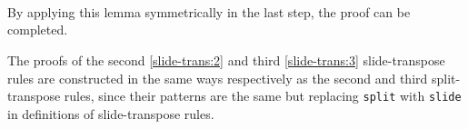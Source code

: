 \documentclass{l4proj}
\begin{document}
\begin{code}
\AgdaSymbol{(}\AgdaSpace{}%
\AgdaSymbol{)}\AgdaSpace{}%
\AgdaSymbol{(}\AgdaSpace{}%
\AgdaSymbol{(}\AgdaSpace{}%
\AgdaSpace{}%
\AgdaSpace{}%
\AgdaSymbol{)}\AgdaSpace{}%
\AgdaSymbol{)))}\AgdaSpace{}%
\AgdaSymbol{))}\AgdaSpace{}%
\<%
\\
%
\>[2]\AgdaSpace{}%
\AgdaSymbol{(}\AgdaSpace{}%
\AgdaSymbol{(}\AgdaSpace{}%
\AgdaSpace{}%
\AgdaSymbol{\{}\AgdaSpace{}%
\AgdaSymbol{(}\AgdaSpace{}%
\AgdaOperator{\AgdaPrimitive{+}}\AgdaSpace{}%
\AgdaSpace{}%
\AgdaOperator{\AgdaPrimitive{*}}\AgdaSpace{}%
\AgdaSpace{}%
\AgdaSymbol{)\})}\AgdaSpace{}%
\AgdaSymbol{)}\AgdaSpace{}%
\<%
\\
%
\>[2]\AgdaSpace{}%
\AgdaSpace{}%
\AgdaSymbol{(}\AgdaSpace{}%
\AgdaSymbol{(}\AgdaSpace{}%
\AgdaSymbol{(}\AgdaSpace{}%
\AgdaSpace{}%
\AgdaSymbol{)}\AgdaSpace{}%
\AgdaSymbol{(}\AgdaSpace{}%
\AgdaSymbol{(}\AgdaSpace{}%
\AgdaSymbol{(}\AgdaSpace{}%
\AgdaSymbol{))}\<%
\\
%
\>[2]\AgdaSymbol{(}\AgdaSpace{}%
\AgdaSymbol{(}\AgdaSpace{}%
\AgdaSymbol{(}\AgdaSpace{}%
\AgdaSpace{}%
\AgdaSpace{}%
\AgdaSymbol{))}\AgdaSpace{}%
\AgdaSymbol{))))}\<%
\end{code}
By applying this lemma symmetrically in the last step, the proof can be completed. 

The proofs of the second \ref{slide-trans:2} and third \ref{slide-trans:3} slide-transpose rules are constructed in the same ways respectively as the second and third split-transpose rules, since their patterns are the same but replacing \texttt{split} with \texttt{slide} in definitions of slide-transpose rules.
\end{document}
